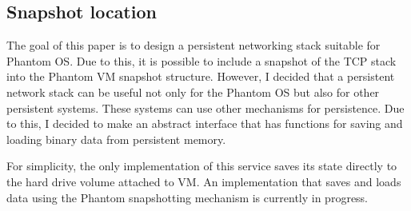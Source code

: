\subsection{Snapshot location}

The goal of this paper is to design a persistent networking stack suitable for
Phantom OS. Due to this, it is possible to include a snapshot of the TCP stack
into the Phantom VM snapshot structure. However, I decided that a persistent
network stack can be useful not only for the Phantom OS but also for other
persistent systems. These systems can use other mechanisms for persistence. Due
to this, I decided to make an abstract interface that has functions for saving
and loading binary data from persistent memory.

For simplicity, the only implementation of this service saves its state
directly to the hard drive volume attached to VM. An implementation that saves
and loads data using the Phantom snapshotting mechanism is currently in
progress.
